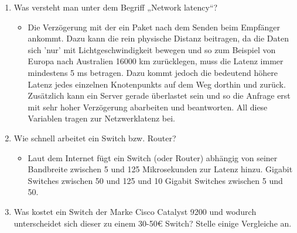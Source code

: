 \documentclass{article}
\begin{document}
\begin{enumerate}
\begin{itemize}
\begin{itemize}
				\item{Laut Microsoft kommt man nur mit Audio bereits mit 10 Kbps (1,25 KB/s) aus, rät aber zu mindestens 58 bis 76 Kbps (7,25 - 9,5 KB/s). Mit Video steigt das bereits auf empfohlene 1500 Kbps (187,5 KB/s). (Up- und Down)}
				\item{Interessanterweise sind die empfohlenen Anforderungen mit oder ohne Screenshare gleich bei 1500 Kbps. Nur die Mindestanforderungen steigen von 150 Kbps (18,75 KB/s) auf 200 Kbps (25 KB/s)}
			\end{itemize}
			\item[d]{Einen Dateidownload}
			\begin{itemize}
				\item{Das hängt von der Größe der Datei ab. Bei einer 2 MB großen Datei reichen 200 KB/s aus, während man z.B. bei 5 GB da relativ lange warten muss. Die Bandbreite bei der man sich nicht mehr über Wartezeiten bei Downloads Sorgen machen muss, liegt wahrscheinlich bei 100 Mbps (Persönliche Einschätzung)}
			\end{itemize}
		\end{itemize}
		\item{Was versteht man unter dem Begriff „Network latency“?}
		\begin{itemize}
			\item{Die Verzögerung mit der ein Paket nach dem Senden beim Empfänger ankommt. Dazu kann die rein physische Distanz beitragen, da die Daten sich 'nur' mit Lichtgeschwindigkeit bewegen und so zum Beispiel von Europa nach Australien 16000 km zurücklegen, muss die Latenz immer mindestens 5 ms betragen. Dazu kommt jedoch die bedeutend höhere Latenz jedes einzelnen Knotenpunkts auf dem Weg dorthin und zurück. Zusätzlich kann ein Server gerade überlastet sein und so die Anfrage erst mit sehr hoher Verzögerung abarbeiten und beantworten. All diese Variablen tragen zur Netzwerklatenz bei.}
		\end{itemize}
		\item{Wie schnell arbeitet ein Switch bzw. Router?}
		\begin{itemize}
			\item{Laut dem Internet fügt ein Switch (oder Router) abhängig von seiner Bandbreite zwischen 5 und 125 Mikrosekunden zur Latenz hinzu. Gigabit Switches zwischen 50 und 125 und 10 Gigabit Switches zwischen 5 und 50.}
		\end{itemize}
		\item{Was kostet ein Switch der Marke Cisco Catalyst 9200 und wodurch unterscheidet sich dieser zu einem 30-50€ Switch? Stelle einige Vergleiche an.}

\end{enumerate}
\end{document}
